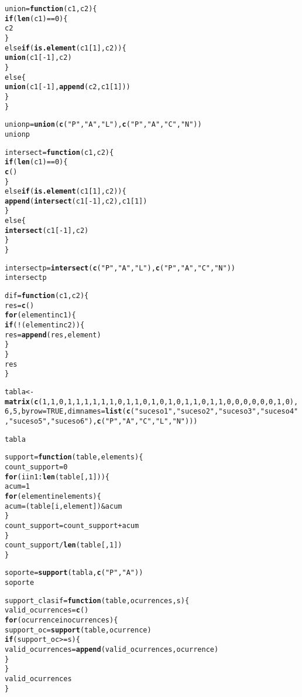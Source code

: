 \documentclass[12pt]{report}\usepackage[]{graphicx}\usepackage[dvipsnames]{xcolor}
\makeatletter
\newcommand{\hlstr}[1]{\textcolor[rgb]{0.192,0.494,0.8}{#1}}%
\newcommand{\hlkwd}[1]{\textcolor[rgb]{0.737,0.353,0.396}{\textbf{#1}}}%
\newenvironment{kframe}{%
 \def\at@end@of@kframe{}%
 \ifinner\ifhmode%
  \def\at@end@of@kframe{\end{minipage}}%
  \begin{minipage}{\columnwidth}%
 \fi\fi%
 \def\FrameCommand##1{\hskip\@totalleftmargin \hskip-\fboxsep
 \colorbox{shadecolor}{##1}\hskip-\fboxsep
     \hskip-\linewidth \hskip-\@totalleftmargin \hskip\columnwidth}%
 \MakeFramed {\advance\hsize-\width
   \@totalleftmargin\z@ \linewidth\hsize
   \@setminipage}}%
 {\par\unskip\endMakeFramed%
 \at@end@of@kframe}
\newenvironment{knitrout}{}{} %
\makeatother
\begin{document}
\begin{knitrout}
\color{fgcolor}\begin{kframe}
\begin{alltt}
union = \hlkwd{function}(c1, c2)\{
	\hlkwd{if} (\hlkwd{len}(c1) == 0)\{
		c2
	\}
	else \hlkwd{if} (\hlkwd{is.element}(c1[1], c2))\{
		\hlkwd{union}(c1[-1], c2)
	\}
	else\{
		\hlkwd{union}(c1[-1], \hlkwd{append}(c2, c1[1]))
	\}
\}

unionp = \hlkwd{union}(\hlkwd{c}(\hlstr{"P"},\hlstr{"A"}, \hlstr{"L"}), \hlkwd{c}(\hlstr{"P"},\hlstr{"A"}, \hlstr{"C"}, \hlstr{"N"}))
unionp


intersect = \hlkwd{function}(c1, c2)\{
	\hlkwd{if} (\hlkwd{len}(c1) == 0)\{
		\hlkwd{c}()
	\}
	else \hlkwd{if} (\hlkwd{is.element}(c1[1], c2))\{
		\hlkwd{append}(\hlkwd{intersect}(c1[-1], c2), c1[1])
	\}
	else\{
		\hlkwd{intersect}(c1[-1], c2)
	\}
\}

intersectp = \hlkwd{intersect}(\hlkwd{c}(\hlstr{"P"},\hlstr{"A"}, \hlstr{"L"}), \hlkwd{c}(\hlstr{"P"},\hlstr{"A"}, \hlstr{"C"}, \hlstr{"N"}))
intersectp

dif = \hlkwd{function}(c1, c2) \{
	res = \hlkwd{c}()
	\hlkwd{for} (element in c1) \{
		\hlkwd{if} (!(element in c2)) \{
			res = \hlkwd{append}(res, element)
		\}
	\}
	res
\}

tabla <- \hlkwd{matrix}(\hlkwd{c}(1,1,0,1,1, 1,1,1,1,0, 1,1,0,1,0, 1,0,1,1,0, 1,1,0,0,0, 0,0,0,1,0),6,5,byrow=TRUE,dimnames=\hlkwd{list}(\hlkwd{c}(\hlstr{"suceso1"},\hlstr{"suceso2"},\hlstr{"suceso3"},\hlstr{"suceso4"},\hlstr{"suceso5"},\hlstr{"suceso6"}),\hlkwd{c}(\hlstr{"P"},\hlstr{"A"},\hlstr{"C"},\hlstr{"L"},\hlstr{"N"})))

tabla

support = \hlkwd{function}(table, elements)\{
	count_support = 0
	\hlkwd{for} (i in 1:\hlkwd{len}(table[,1]))\{
		acum = 1
		\hlkwd{for} (element in elements)\{
			acum = (table[i,element]) & acum
		\}
		count_support = count_support + acum
	\}
	count_support/\hlkwd{len}(table[,1])		
\}

soporte = \hlkwd{support}(tabla, \hlkwd{c}(\hlstr{"P"},\hlstr{"A"}))
soporte


support_clasif = \hlkwd{function}(table, ocurrences, s)\{
	valid_ocurrences = \hlkwd{c}()
	\hlkwd{for} (ocurrence in ocurrences)\{
		support_oc = \hlkwd{support}(table, ocurrence)
		\hlkwd{if} (support_oc >= s)\{
			valid_ocurrences = \hlkwd{append}(valid_ocurrences, ocurrence)
		\}
	\}
	valid_ocurrences	
\}


\end{alltt}
\end{kframe}
\end{knitrout}
\end{document}
